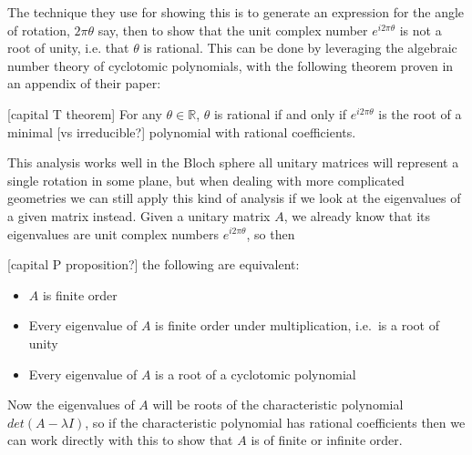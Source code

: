 The technique they use for showing this is to generate an expression for the angle of rotation, $2\pi \theta$ say, then to show that the unit complex number $e^{i2\pi \theta}$ is not a root of unity, i.e. that $\theta$ is rational. This can be done by leveraging the algebraic number theory of cyclotomic polynomials, with the following theorem proven in an appendix of their paper:

[capital T theorem] For any $\theta \in \mathbb{R}$, $\theta$ is rational if and only if $e^{i2\pi \theta}$ is the root of a minimal [vs irreducible?] polynomial with rational coefficients.

This analysis works well in the Bloch sphere all unitary matrices will represent a single rotation in some plane, but when dealing with more complicated geometries we can still apply this kind of analysis if we look at the eigenvalues of a given matrix instead. Given a unitary matrix $A$, we already know that its eigenvalues are unit complex numbers $e^{i 2\pi\theta}$, so then

[capital P proposition?] the following are equivalent:
\begin{itemize}
	\item $A$ is finite order
	\item Every eigenvalue of $A$ is finite order under multiplication, i.e.\ is a root of unity
	\item Every eigenvalue of $A$ is a root of a cyclotomic polynomial
\end{itemize}

Now the eigenvalues of $A$ will be roots of the characteristic polynomial $det(A - \lambda I)$, so if the characteristic polynomial has rational coefficients then we can work directly with this to show that $A$ is of finite or infinite order.

